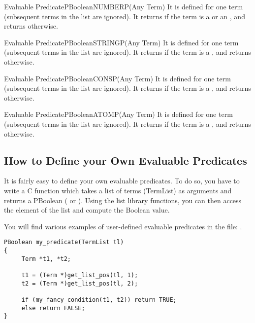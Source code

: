 \begin{typeep}{Evaluable Predicate}{PBoolean}{NUMBERP}{(Any Term)}
It is defined for one term (subsequent terms in the list are ignored). It
returns  if the term is a  or an , and 
returns  otherwise.
\end{typeep}

\begin{typeep}{Evaluable Predicate}{PBoolean}{STRINGP}{(Any Term)}
It is defined for one term (subsequent terms in the list are ignored). It
returns  if the term is a , and 
returns  otherwise.
\end{typeep}

\begin{typeep}{Evaluable Predicate}{PBoolean}{CONSP}{(Any Term)}
It is defined for one term (subsequent terms in the list are ignored). It
returns  if the term is a , and 
returns  otherwise.
\end{typeep}

\begin{typeep}{Evaluable Predicate}{PBoolean}{ATOMP}{(Any Term)}
It is defined for one term (subsequent terms in the list are ignored). It
returns  if the term is a , and 
returns  otherwise.
\end{typeep}

\subsection{How to Define your Own Evaluable Predicates}

It is fairly easy to define your own evaluable predicates. To do so, you
have to write a C function which takes a list of terms (TermList) as
arguments and returns a PBoolean ( or ). Using the list library
functions, you can then access the element of the list and compute the
Boolean value.

You will find various examples of user-defined evaluable predicates in the
file: .

\begin{verbatim}
PBoolean my_predicate(TermList tl)
{
     Term *t1, *t2;

     t1 = (Term *)get_list_pos(tl, 1);
     t2 = (Term *)get_list_pos(tl, 2);

     if (my_fancy_condition(t1, t2)) return TRUE;
     else return FALSE;
}
\end{verbatim}

